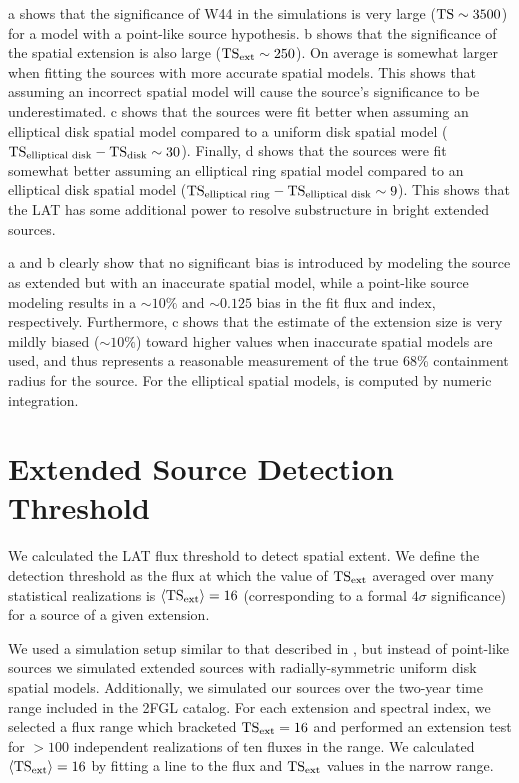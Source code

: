 a 
shows that
the significance of W44 in the simulations is very large ($\mathrm{TS}\sim3500$) 
for a model with a point-like source hypothesis.
b shows that 
the significance of the spatial extension is also large
($\mathrm{TS}_\mathrm{ext}\sim250$).  
On average \tsext is somewhat larger when fitting
the sources with more accurate spatial models.  This shows that
assuming an incorrect spatial model will cause the source's
significance to be underestimated.  c
shows that the sources were fit better when assuming an elliptical
disk spatial model compared to a uniform disk spatial model
($\ts_\text{elliptical\ disk}-\ts_\text{disk}\sim30$).  Finally,
d shows that the sources were
fit somewhat better assuming an elliptical ring spatial model
compared to an elliptical disk spatial model ($\mathrm{TS}_\text{elliptical\
ring}-\mathrm{TS}_\text{elliptical\ disk}\sim9$). This shows that the LAT has
some additional power to resolve substructure in bright extended sources.


a and b clearly show that
no significant bias is introduced by modeling the source as extended
but with an inaccurate spatial model, while a point-like source modeling
results in a $\sim10\%$ and $\sim0.125$ bias in the fit flux and index,
respectively.  
Furthermore, c shows that the \rsixeight estimate of
the extension size is very mildly biased ($\sim10\%$) toward higher values
when inaccurate spatial models are used, and thus represents a reasonable
measurement of the true 68\% containment radius for the source.
For the elliptical spatial models, \rsixeight is computed by numeric integration.


\section{Extended Source Detection Threshold}

We calculated the LAT flux 
threshold to detect spatial extent. We define the detection threshold as the flux at
which the value of $\mathrm{TS}_\mathrm{ext}$ averaged over many statistical realizations is
$\langle\mathrm{TS}_\mathrm{ext}\rangle=16$ 
(corresponding to a formal $4\sigma$ significance)
for a source of a given extension.

We used a simulation setup similar to that described in
, but instead of point-like sources
we simulated extended sources with radially-symmetric uniform disk spatial 
models. Additionally, we simulated our sources over the two-year
time range included in the 2FGL catalog.  For each extension and spectral index,
we selected a flux range which bracketed $\mathrm{TS}_\mathrm{ext}=16$ and performed an
extension test for $>100$ independent realizations of ten fluxes in
the range.  We calculated $\langle\mathrm{TS}_\mathrm{ext}\rangle=16$ by fitting a line
to the flux and $\mathrm{TS}_\mathrm{ext}$ values in the narrow range.

